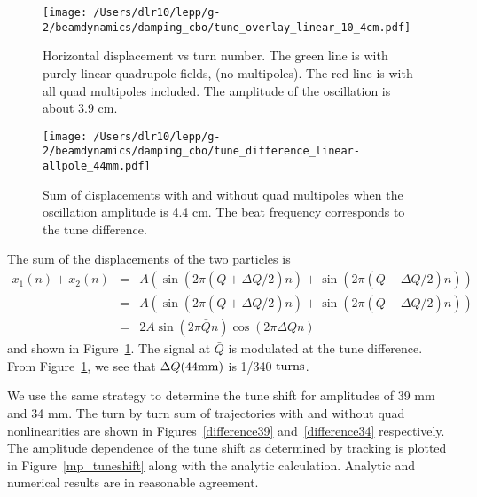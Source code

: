 \documentclass[10pt]{report}
\begin{document}
\begin{figure}[htbp] %
\begin{minipage}[t]{0.48\textwidth}
   \centering
   \texttt{[image: /Users/dlr10/lepp/g-2/beamdynamics/damping\_cbo/tune\_overlay\_linear\_10\_4cm.pdf]} 
   \caption{Horizontal displacement vs turn number. The green line is with purely linear quadrupole fields, (no multipoles). The red line
is with all quad multipoles included. The amplitude of the oscillation is about 3.9 cm. \label{overlay}}
 \end{minipage}
\hfill
\begin{minipage}[t]{0.48\textwidth}
\centering
   \texttt{[image: /Users/dlr10/lepp/g-2/beamdynamics/damping\_cbo/tune\_difference\_linear-allpole\_44mm.pdf]} 
\caption{Sum of displacements with and without quad multipoles when the oscillation amplitude is 4.4 cm. The beat frequency corresponds to the tune difference.
   \label{difference44}}
\end{minipage}
\end{figure}

The sum of the displacements of the two particles is
\begin{eqnarray*}
x_1(n)+x_2(n) &=& A\left(\sin(2\pi (\bar Q+\Delta Q/2) n)+\sin(2\pi(\bar Q-\Delta Q/2)n)\right)\\
&=& A\left(\sin(2\pi (\bar Q+\Delta Q/2) n)+\sin(2\pi(\bar Q-\Delta Q/2)n)\right)\\
&=& 2A\sin(2\pi \bar Q n)\cos(2\pi\Delta Q n)
\end{eqnarray*}
and shown in Figure~\ref{difference44}. The signal at $\bar Q$ is modulated at the tune difference.
From Figure~\ref{difference44}, we see that $\Delta Q (44{\rm mm})$ is 1/340 ${\rm turns}$.

We use the same strategy to determine the tune shift for amplitudes of 39 mm and 34 mm. The turn by turn sum
of trajectories with and without quad nonlinearities are shown in Figures~\ref{difference39} and~\ref{difference34} respectively.
The amplitude dependence of the tune shift as determined by tracking is plotted in Figure~\ref{mp_tuneshift} along with
the analytic calculation. Analytic and numerical results are in reasonable agreement. 
%
\end{document}
